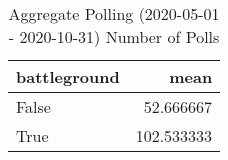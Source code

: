 \begin{table}
\centering
\caption{Aggregate Polling (2020-05-01 - 2020-10-31) Number of Polls}
\begin{tabular}{lr}
\toprule
 battleground &        mean \\
\midrule
        False &   52.666667 \\
         True &  102.533333 \\
\bottomrule
\end{tabular}
\end{table}
